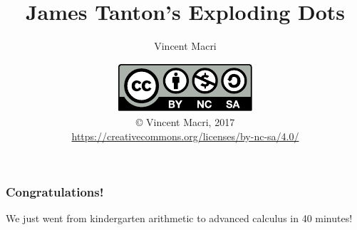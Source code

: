 

\usepackage{mathtools}




\frenchspacing

\title{James Tanton's Exploding Dots}
\author{Vincent Macri}
\date{\includegraphics{by-nc-sa}\\\copyright{} Vincent Macri, 2017\\\footnotesize\url{https://creativecommons.org/licenses/by-nc-sa/4.0/}}


\newenvironment{whatif}%
	{\begin{namedframe}{What if\ldots}\Huge What if\ldots\normalsize

	}
	{\end{namedframe}}


	\frame{\titlepage}
	
	
	
	
	
	
	
	\begin{frame}
		\frametitle{Congratulations!}
		We just went from kindergarten arithmetic to advanced calculus in 40 minutes!
	\end{frame}

